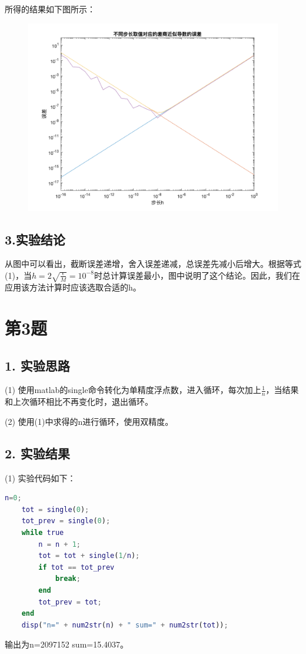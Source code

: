 \documentclass[12pt, utf8, hyperref]{article}
\begin{document}
所得的结果如下图所示：
\begin{figure}[H]
	\centering
	\includegraphics[scale=0.3]{../fig1.png}
	\label{Fig0}
\end{figure}

\subsection*{3.实验结论}
从图中可以看出，截断误差递增，舍入误差递减，总误差先减小后增大。根据等式(1)，当$h=2\sqrt{\frac{\epsilon}{M}}=10^{-8}$时总计算误差最小，图中说明了这个结论。因此，我们在应用该方法计算时应该选取合适的h。

\section*{第3题}
\subsection*{1. 实验思路}
(1) 使用matlab的single命令转化为单精度浮点数，进入循环，每次加上$\frac{1}{n}$，当结果和上次循环相比不再变化时，退出循环。

(2) 使用(1)中求得的n进行循环，使用双精度。

\subsection*{2. 实验结果}
(1) 实验代码如下：
\begin{lstlisting}[language=matlab]
    n=0;
    tot = single(0);
    tot_prev = single(0);
    while true
        n = n + 1;
        tot = tot + single(1/n);
        if tot == tot_prev
            break;
        end
        tot_prev = tot;
    end
    disp("n=" + num2str(n) + " sum=" + num2str(tot));
\end{lstlisting}
输出为n=2097152 sum=15.4037。
\end{document}
